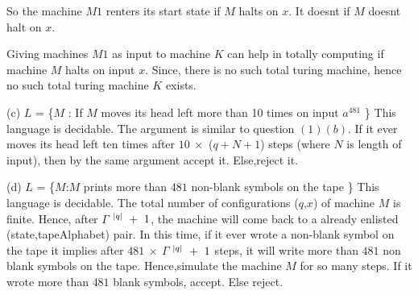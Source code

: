 \documentclass[addpoints,12pt]{exam}
\begin{document}
\begin{questions}
\begin{itemize}
	\end{itemize}
	So the machine $M1$ renters its start state if $M$ halts on $x$. It doesnt if $M$ doesnt halt on $x$.

      Giving machines $M1$ as input to machine $K$ can help in totally computing if machine $M$ halts on input $x$. Since, there is no such total turing machine, hence no such total turing machine $K$ exists.
      \newline
      
      (c) \quad $L$ = \{$M$ : If $M$ moves its head left more than 10 times on input $a^{481}$ \} \newline
	This language is decidable. The argument is similar to question $(1)(b)$. If it ever moves its head left ten times after $10~\times $ ($q + N + 1$) steps (where $N$ is length of input), then
	by the same argument accept it. Else,reject it.
	\newline
	
      (d) \quad $L$ = \{$M$:$M$ prints more than $481$ non-blank symbols on the tape \} \newline
      This language is decidable. The total number of configurations ($q$,$x$) of machine $M$ is finite. Hence, after \textbar $\Gamma$ \textbar $^{\text{\textbar} q \text{\textbar}}~+~1$, the machine
      will come back to a already enlisted (state,tapeAlphabet) pair. In this time, if it ever wrote a non-blank symbol on the tape it implies after $481~\times~$\textbar $\Gamma$ \textbar $^{\text{\textbar} q \text{\textbar}}~+~1$ steps, it will write more than $481$ non blank symbols on the tape.
      Hence,simulate the machine $M$ for so many steps. If it wrote more than $481$ blank symbols, accept. Else reject.
      \newline
      
 \question
\end{questions}
\end{document}
